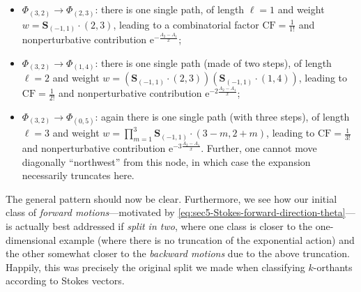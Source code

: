 \documentclass[11pt,a4paper]{article}
\newcommand{\rme}{{\mathrm{e}}}
\begin{document}
\begin{itemize}
\begin{itemize}
%
\item $\Phi_{(3,2)}\rightarrow\Phi_{\left(2,3\right)}$: there is one single path, of length $\ell=1$ and weight $w = \boldsymbol{S}_{(-1,1)} \cdot (2,3)$, leading to a combinatorial factor $\mathrm{CF}=\frac{1}{1!}$ and nonperturbative contribution $\rme^{-\frac{A_{2}-A_{1}}{x}}$;
%
\item $\Phi_{(3,2)}\rightarrow\Phi_{\left(1,4\right)}$: there is one single path (made of two steps), of length $\ell=2$ and weight $w = \left( \boldsymbol{S}_{(-1,1)} \cdot (2,3) \right) \left( \boldsymbol{S}_{(-1,1)} \cdot (1,4) \right)$, leading to $\mathrm{CF}=\frac{1}{2!}$ and nonperturbative contribution $\rme^{-2\frac{A_{2}-A_{1}}{x}}$;
%
\item $\Phi_{(3,2)}\rightarrow\Phi_{\left(0,5\right)}$: again there is one single path (with three steps), of length $\ell=3$ and weight $w = \prod_{m=1}^{3} \boldsymbol{S}_{(-1,1)} \cdot (3-m,2+m)$, leading to $\mathrm{CF}=\frac{1}{3!}$ and nonperturbative contribution $\rme^{-3\frac{A_{2}-A_{1}}{x}}$. Further, one cannot move diagonally ``northwest'' from this node, in which case the expansion necessarily truncates here.
%
\end{itemize}
%
\end{itemize}
%
\noindent
The general pattern should now be clear. Furthermore, we see how our initial class of \textit{forward motions}---motivated by \eqref{eq:sec5-Stokes-forward-direction-theta}---is actually best addressed if \textit{split in two}, where one class is closer to the one-dimensional example (where there is no truncation of the exponential action) and the other somewhat closer to the \textit{backward motions} due to the above truncation. Happily, this was precisely the original split we made when classifying $k$-orthants according to Stokes vectors.
\end{document}
